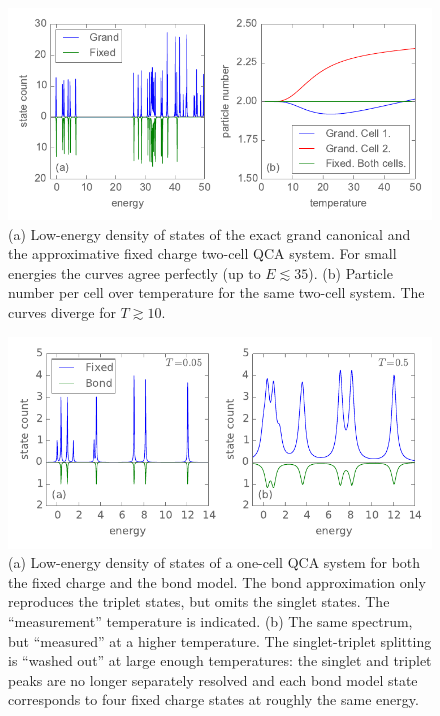 %
\begin{figure}
  \center
  \includegraphics{fixed_charge_approximation}
  \caption{
  (a) Low-energy density of states of the exact grand canonical and the
  approximative fixed charge two-cell QCA system. For small energies the curves
  agree perfectly (up to $E \lesssim 35$). (b) Particle number per cell over
  temperature for the same two-cell system. The curves diverge for $T \gtrsim
  10$.
  }
  \label{fig:fixed_charge_approximation}
\end{figure}
%
%
\begin{figure}
  \center
  \includegraphics{bond_approximation1}
  \caption{
  (a) Low-energy density of states of a one-cell QCA system for both the fixed
  charge and the bond model. The bond approximation only reproduces the triplet
  states, but omits the singlet states. The ``measurement'' temperature is
  indicated. (b) The same spectrum, but ``measured'' at a higher temperature.
  The singlet-triplet splitting is ``washed out'' at large enough temperatures:
  the singlet and triplet peaks are no longer separately resolved and each bond
  model state corresponds to four fixed charge states at roughly the same
  energy.
  }
  \label{fig:bond_approximation1}
\end{figure}
